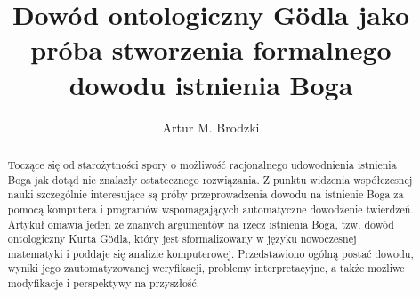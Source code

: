 \documentclass[
	runningheads
]{llncs}
\begin{document}
\title{
	Dowód ontologiczny G\"odla jako próba stworzenia formalnego dowodu istnienia Boga
}

\author{
	Artur M. Brodzki
}

%
\maketitle

\begin{abstract}
Toczące się od starożytności spory o możliwość racjonalnego udowodnienia istnienia Boga jak dotąd nie znalazły ostatecznego rozwiązania. Z punktu widzenia współczesnej nauki szczególnie interesujące są próby przeprowadzenia dowodu na istnienie Boga za pomocą komputera i programów wspomagających automatyczne dowodzenie twierdzeń. Artykuł omawia jeden ze znanych argumentów na rzecz istnienia Boga, tzw. dowód ontologiczny Kurta G\"odla, który jest sformalizowany w języku nowoczesnej matematyki i poddaje się analizie komputerowej. Przedstawiono ogólną postać dowodu, wyniki jego zautomatyzowanej weryfikacji, problemy interpretacyjne, a także możliwe modyfikacje i perspektywy na przyszłość. 

\end{abstract}
\end{document}
